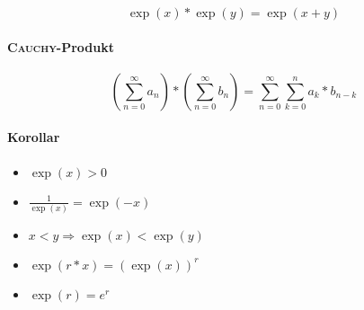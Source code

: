 $$\exp(x) * \exp(y) = \exp(x + y)$$

\paragraph{\textsc{Cauchy}-Produkt}

$$(\sum_{n = 0}^\infty a_n) * (\sum_{n = 0}^\infty b_n) = \sum_{n = 0}^\infty \sum_{k = 0}^n a_k * b_{n - k}$$

\paragraph{Korollar}

\begin{itemize}
      \item $\exp (x) > 0$
      \item $\frac{1}{\exp (x)} = \exp (-x)$
      \item $x < y \Rightarrow \exp (x) < \exp (y)$
      \item $\exp(r * x) = (\exp (x))^r$
      \item $\exp(r) = e^r$
\end{itemize}